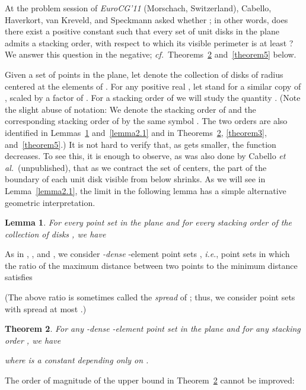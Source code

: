 \documentclass[11pt]{article}
\newtheorem{thm}{Theorem}             \newtheorem{lem}[thm]{Lemma}
\begin{document}
At the problem session of {\em EuroCG'11} (Morschach, Switzerland), Cabello, Haverkort, van Kreveld, and Speckmann asked whether ; in other words, does there exist a positive constant  such that every set of  unit disks in the plane admits a stacking order, with respect to which its visible perimeter is at least ?  We answer this question in the negative; {\em cf.}\ Theorems~\ref{theorem2} and~\ref{theorem5} below.

Given a set of points  in the plane, let  denote the
collection of disks of radius  centered at the elements of . For any
positive real , let  stand for a similar copy of , scaled by
a factor of . For a stacking order  of  we will study
the quantity . (Note the slight abuse of notation:
We denote the stacking order of  and the corresponding
stacking order of  by the same symbol . The two orders are also identified in Lemmas~\ref{lemma1} and~\ref{lemma2.1} and in Theorems~\ref{theorem2}, \ref{theorem3}, and~\ref{theorem5}.) It is not hard to verify that, as  gets smaller, the function  decreases. To see this, it is enough to observe, as was also done by
Cabello {\em et al.}\ (unpublished), that as we contract the set of centers,
the part of the boundary of each unit disk visible from below shrinks. As we
will see in Lemma~\ref{lemma2.1}, the limit in the following lemma has a simple alternative geometric interpretation.

\begin{lem}\label{lemma1}  For every point set  in the plane and for
  every stacking order  of the collection of disks , we have

\end{lem}

As in \cite{AlKP89}, \cite{Va92}, and \cite{Va96}, we consider {\em -dense}
-element point sets , {\em i.e}., point sets in which the ratio of the maximum distance between two points to the minimum distance satisfies

(The above ratio is sometimes called the \emph{spread} of  \cite{Er03}; thus, we consider point sets with spread at most .)

\begin{thm}\label{theorem2} For any -dense -element point set  in the plane and for any stacking order , we have

where  is a constant depending only on .
\end{thm}

The order of magnitude of the upper bound in Theorem~\ref{theorem2} cannot be
improved:
\end{document}
